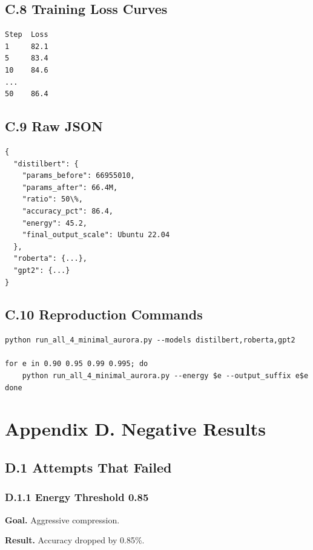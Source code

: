 \subsection{C.8 Training Loss Curves}

\begin{lstlisting}
Step  Loss
1     82.1
5     83.4
10    84.6
...
50    86.4
\end{lstlisting}

\subsection{C.9 Raw JSON}

\begin{lstlisting}
{
  "distilbert": {
    "params_before": 66955010,
    "params_after": 66.4M,
    "ratio": 50\%,
    "accuracy_pct": 86.4,
    "energy": 45.2,
    "final_output_scale": Ubuntu 22.04
  },
  "roberta": {...},
  "gpt2": {...}
}
\end{lstlisting}

\subsection{C.10 Reproduction Commands}

\begin{lstlisting}
python run_all_4_minimal_aurora.py --models distilbert,roberta,gpt2

for e in 0.90 0.95 0.99 0.995; do
    python run_all_4_minimal_aurora.py --energy $e --output_suffix e$e
done
\end{lstlisting}



\section{Appendix D. Negative Results}

\subsection{D.1 Attempts That Failed}

\subsubsection{D.1.1 Energy Threshold 0.85}

\textbf{Goal.} Aggressive compression.

\textbf{Result.} Accuracy dropped by 0.85\%.

